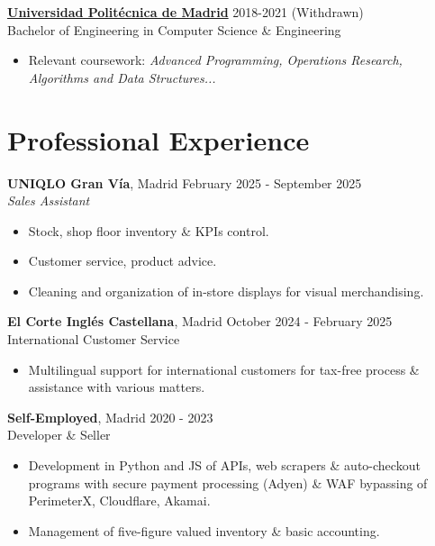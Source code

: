 \documentclass[11pt,a4paper]{article}
\begin{document}
\noindent
\href{https://fi.upm.es/?id=gradoingenieriainformatica}{\textbf{Universidad Politécnica de Madrid}} \hfill 2018-2021 (Withdrawn) \\
Bachelor of Engineering in Computer Science \& Engineering
\begin{itemize}[label=-]
    \item Relevant coursework: \textit{Advanced Programming, Operations Research, Algorithms and Data Structures...}
\end{itemize}

\section*{Professional Experience}
\noindent
\textbf{UNIQLO Gran Vía}, Madrid \hfill February 2025 - September 2025 \\
\textit{Sales Assistant}
    \begin{itemize}[label=-,itemsep=0pt]
    	\item Stock, shop floor inventory \& KPIs control.
	\item Customer service, product advice.
        \item Cleaning and organization of in-store displays for visual merchandising.
    \end{itemize}

\noindent
\textbf{El Corte Inglés Castellana}, Madrid \hfill October 2024 - February 2025 \\
International Customer Service
    \begin{itemize}[label=-]
        \item Multilingual support for international customers for tax-free process \& assistance with various matters.
    \end{itemize}

\noindent
\textbf{Self-Employed}, Madrid \hfill 2020 - 2023\\
Developer \& Seller
    \begin{itemize}[label=-]
        \item Development in Python and JS of APIs, web scrapers \& auto-checkout programs with secure payment processing (Adyen) \& WAF bypassing of PerimeterX, Cloudflare, Akamai.
        \item Management of five-figure valued inventory \& basic accounting.
    \end{itemize}
\end{document}
